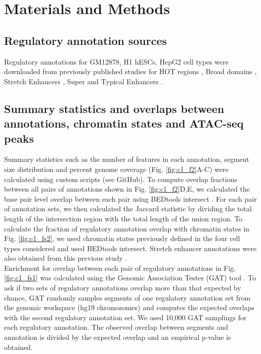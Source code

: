 \section{Materials and Methods}

\subsection{Regulatory annotation sources}
Regulatory annotations for GM12878, H1 hESCs, HepG2 cell types were downloaded from previously published studies for HOT regions \cite{boyleComparativeAnalysisRegulatory2014}, Broad domains \cite{benayounH3K4me3BreadthLinked2014}, Stretch Enhancers \cite{varshneyGeneticRegulatorySignatures2017}, Super and Typical Enhancers \cite{hniszSuperEnhancersControlCell2013}.

\subsection{Summary statistics and overlaps between annotations, chromatin states and ATAC-seq peaks}
Summary statistics such as the number of features in each annotation, segment size distribution and percent genome coverage (Fig. \ref{fig:c1_f2}A-C) were calculated using custom scripts (see GitHub). To compute overlap fractions between all pairs of annotations shown in Fig. \ref{fig:c1_f2}D,E, we calculated the base pair level overlap between each pair using BEDtools intersect \cite{quinlanBEDToolsFlexibleSuite2010}. For each pair of annotation sets, we then calculated the Jaccard statistic by dividing the total length of the intersection region with the total length of the union region. To calculate the fraction of regulatory annotation overlap with chromatin states in Fig. \ref{fig:c1_fs2}, we used chromatin states previously defined in the four cell types considered \cite{varshneyGeneticRegulatorySignatures2017} and used BEDtools intersect. Stretch enhancer annotations were also obtained from this previous study \cite{varshneyGeneticRegulatorySignatures2017}. \\

Enrichment for overlap between each pair of regulatory annotations in Fig. \ref{fig:c1_fs1} was calculated using the Genomic Association Tester (GAT) tool \cite{hegerGATSimulationFramework2013}. To ask if two sets of regulatory annotations overlap more than that expected by chance, GAT randomly samples segments of one regulatory annotation set from the genomic workspace (hg19 chromosomes) and computes the expected overlaps with the second regulatory annotation set. We used 10,000 GAT samplings for each regulatory annotation. The observed overlap between segments and annotation is divided by the expected overlap and an empirical p-value is obtained.


